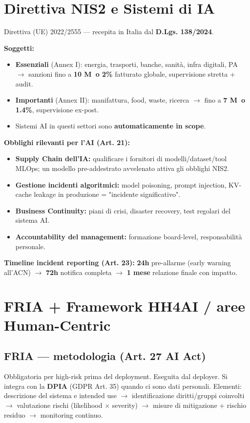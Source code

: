 \documentclass[11pt, a4paper]{article}
\begin{document}
\section{Direttiva NIS2 e Sistemi di IA}

Direttiva (UE) 2022/2555 — recepita in Italia dal \textbf{D.Lgs. 138/2024}.

\textbf{Soggetti:}
\begin{itemize}[leftmargin=*]
    \item \textbf{Essenziali} (Annex I): energia, trasporti, banche, sanità, infra digitali, PA $\rightarrow$ sanzioni fino a \textbf{10 M\texteuro\ o 2\%} fatturato globale, supervisione stretta + audit.
    \item \textbf{Importanti} (Annex II): manifattura, food, waste, ricerca $\rightarrow$ fino a \textbf{7 M\texteuro\ o 1.4\%}, supervisione ex-post.
    \item Sistemi AI in questi settori sono \textbf{automaticamente in scope}.
\end{itemize}

\textbf{Obblighi rilevanti per l'AI (Art. 21):}
\begin{itemize}[leftmargin=*]
    \item \textbf{Supply Chain dell'IA:} qualificare i fornitori di modelli/dataset/tool MLOps; un modello pre-addestrato avvelenato attiva gli obblighi NIS2.
    \item \textbf{Gestione incidenti algoritmici:} model poisoning, prompt injection, KV-cache leakage in produzione = "incidente significativo".
    \item \textbf{Business Continuity:} piani di crisi, disaster recovery, test regolari del sistema AI.
    \item \textbf{Accountability del management:} formazione board-level, responsabilità personale.
\end{itemize}

\textbf{Timeline incident reporting (Art. 23):} \textbf{24h} pre-allarme (early warning all'ACN) $\rightarrow$ \textbf{72h} notifica completa $\rightarrow$ \textbf{1 mese} relazione finale con impatto.

\section{FRIA + Framework HH4AI / aree Human-Centric}

\subsection{FRIA — metodologia (Art. 27 AI Act)}
Obbligatoria per high-risk prima del deployment. Eseguita dal deployer. Si integra con la \textbf{DPIA} (GDPR Art. 35) quando ci sono dati personali. Elementi: descrizione del sistema e intended use $\rightarrow$ identificazione diritti/gruppi coinvolti $\rightarrow$ valutazione rischi (likelihood $\times$ severity) $\rightarrow$ misure di mitigazione + rischio residuo $\rightarrow$ monitoring continuo.
\end{document}

